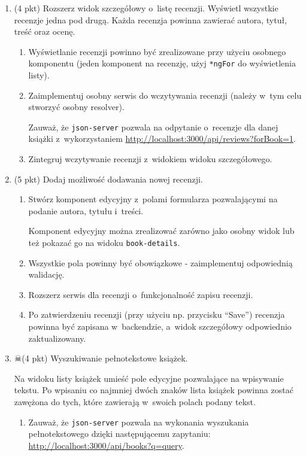 \documentclass[12pt]{article}
\begin{document}
\begin{enumerate}
		\item
			(4 pkt) Rozszerz widok szczegółowy o~listę recenzji. Wyświetl wszystkie recenzje jedna pod drugą. Każda recenzja powinna zawierać autora, tytuł, treść oraz ocenę.
			\begin{enumerate}
				\item Wyświetlanie recenzji powinno być zrealizowane przy użyciu osobnego komponentu (jeden komponent na recenzję, użyj \texttt{*ngFor} do wyświetlenia listy).

				\item Zaimplementuj osobny serwis do wczytywania recenzji (należy w~tym celu stworzyć osobny resolver).

				Zauważ, że \texttt{json-server} pozwala na odpytanie o~recenzje dla danej książki z~wykorzystaniem \href{http://localhost:3000/api/reviews?forBook=1}{http://localhost:3000/api/reviews?forBook=1}.

				\item Zintegruj wczytywanie recenzji z~widokiem widoku szczegółowego.
			\end{enumerate}

		\item
			(5 pkt) Dodaj możliwość dodawania nowej recenzji.
			\begin{enumerate}
				\item Stwórz komponent edycyjny z~polami formularza pozwalającymi na podanie autora, tytułu i~treści.

				Komponent edycyjny można zrealizować zarówno jako osobny widok lub też pokazać go na widoku \texttt{book-details}.
				\item Wszystkie pola powinny być obowiązkowe - zaimplementuj odpowiednią walidację.
				\item Rozszerz serwis dla recenzji o~funkcjonalność zapisu recenzji.
				\item Po zatwierdzeniu recenzji (przy użyciu np. przycisku ``Save'') recenzja powinna być zapisana w~backendzie, a~widok szczegółowy odpowiednio zaktualizowany.
			\end{enumerate}

		\item
			$\skull$(4 pkt) Wyszukiwanie pełnotekstowe książek.

			Na widoku listy książek umieść pole edycyjne pozwalające na wpisywanie tekstu.
			Po wpisaniu co najmniej dwóch znaków lista książek powinna zostać zawężona do tych, które zawierają w~swoich polach podany tekst.

			\begin{enumerate}
				\item Zauważ, że \texttt{json-server} pozwala na wykonania wyszukania pełnotekstowego dzięki następującemu zapytaniu: \href{http://localhost:3000/api/books?q=query}{http://localhost:3000/api/books?q=query}.


\end{enumerate}
\end{enumerate}
\end{document}
